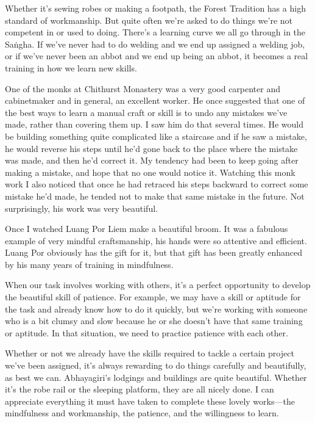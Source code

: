 Whether it's sewing robes or making a footpath, the Forest Tradition 
has a high standard of workmanship. But quite often we're asked to do 
things we're not competent in or used to doing. There's a learning 
curve we all go through in the Saṅgha. If we've never had to do 
welding and we end up assigned a welding job, or if we've never been an 
abbot and we end up being an abbot, it becomes a real training in how 
we learn new skills.

One of the monks at Chithurst Monastery was a very good carpenter and 
cabinetmaker and in general, an excellent worker. He once suggested 
that one of the best ways to learn a manual craft or skill is to undo 
any mistakes we've made, rather than covering them up. I saw him do 
that several times. He would be building something quite complicated 
like a staircase and if he saw a mistake, he would reverse his steps 
until he'd gone back to the place where the mistake was made, and then 
he'd correct it. My tendency had been to keep going after making a 
mistake, and hope that no one would notice it. Watching this monk work 
I also noticed that once he had retraced his steps backward to correct 
some mistake he'd made, he tended not to make that same mistake in the 
future. Not surprisingly, his work was very beautiful.

Once I watched Luang Por Liem make a beautiful broom. It was a fabulous 
example of very mindful craftsmanship, his hands were so attentive and 
efficient. Luang Por obviously has the gift for it, but that gift has 
been greatly enhanced by his many years of training in mindfulness.

When our task involves working with others, it's a perfect opportunity 
to develop the beautiful skill of patience. For example, we may have a 
skill or aptitude for the task and already know how to do it quickly, 
but we're working with someone who is a bit clumsy and slow because he 
or she doesn't have that same training or aptitude. In that situation, 
we need to practice patience with each other.

Whether or not we already have the skills required to tackle a certain 
project we've been assigned, it's always rewarding to do things 
carefully and beautifully, as best we can. Abhayagiri's lodgings and 
buildings are quite beautiful. Whether it's the robe rail or the 
sleeping platform, they are all nicely done. I can appreciate 
everything it must have taken to complete these lovely works---the 
mindfulness and workmanship, the patience, and the willingness to learn.


